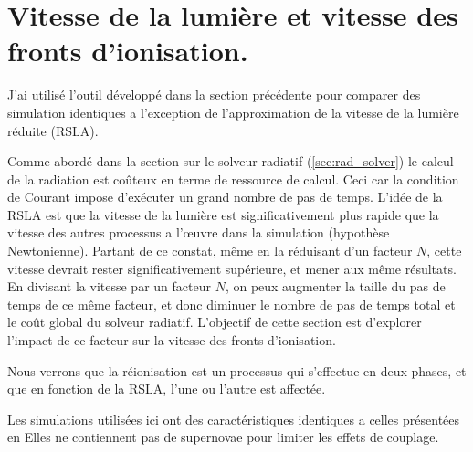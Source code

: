 \chapter{Vitesse de la lumière et vitesse des fronts d'ionisation.}
\label{sec:lightspeed}
J'ai utilisé l'outil développé dans la section précédente pour comparer des simulation identiques a l'exception de l'approximation de la vitesse de la lumière réduite (\ac{RSLA}).

Comme abordé dans la section sur le solveur radiatif (\ref{sec:rad_solver}) le calcul de la radiation est coûteux en terme de ressource de calcul.
Ceci car la condition de Courant impose d'exécuter un grand nombre de pas de temps.
L'idée de la \ac{RSLA} est que la vitesse de la lumière est significativement plus rapide que la vitesse des autres processus a l’œuvre dans la simulation (hypothèse Newtonienne).
Partant de ce constat, même en la réduisant d'un facteur $N$, cette vitesse devrait rester significativement supérieure, et mener aux même résultats.
En divisant la vitesse par un facteur $N$, on peux augmenter la taille du pas de temps de ce même facteur, et donc diminuer le nombre de pas de temps total et le coût global du solveur radiatif.
L'objectif de cette section est d'explorer l'impact de ce facteur sur la vitesse des fronts d'ionisation.

Nous verrons que la réionisation est un processus qui s'effectue en deux phases, et que en fonction de la \ac{RSLA}, l'une ou l'autre est affectée.


Les simulations utilisées ici ont des caractéristiques identiques a celles présentées en %
Elles ne contiennent pas de supernovae pour limiter les effets de couplage.



